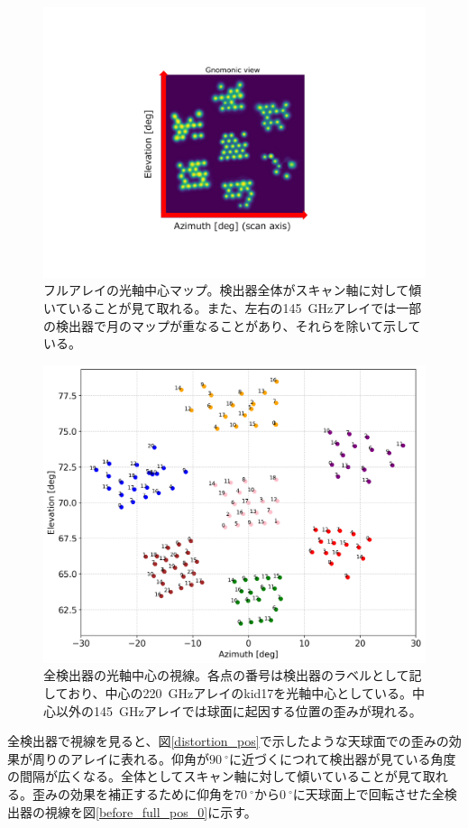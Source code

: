 \begin{figure}[htbp]
  \centering
  \includegraphics[width=0.75\columnwidth]{5_alignment/figs/before_full_gnomonic_selected_mod2.pdf}
  \caption{フルアレイの光軸中心マップ。検出器全体がスキャン軸に対して傾いていることが見て取れる。また、左右の\SI{145}{GHz}アレイでは一部の検出器で月のマップが重なることがあり、それらを除いて示している。}
  \label{before_full_beam_map}
\end{figure}
\begin{figure}[htbp]
  \centering
  \includegraphics[width=0.9\columnwidth]{5_alignment/figs/before_full_pos_70.png}
  \caption{全検出器の光軸中心の視線。各点の番号は検出器のラベルとして記しており、中心の\SI{220}{GHz}アレイのkid17を光軸中心としている。中心以外の\SI{145}{GHz}アレイでは球面に起因する位置の歪みが現れる。}
  \label{before_full_beam_pos}
\end{figure}
全検出器で視線を見ると、図\ref{distortion_pos}で示したような天球面での歪みの効果が周りのアレイに表れる。仰角が$\SI{90}{^{\circ}}$に近づくにつれて検出器が見ている角度の間隔が広くなる。全体としてスキャン軸に対して傾いていることが見て取れる。歪みの効果を補正するために仰角を$\SI{70}{^{\circ}}$から$\SI{0}{^{\circ}}$に天球面上で回転させた全検出器の視線を図\ref{before_full_pos_0}に示す。
